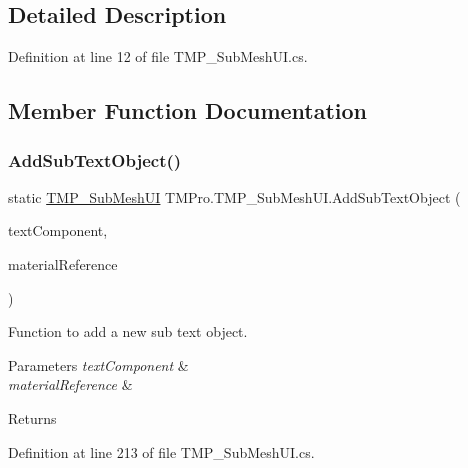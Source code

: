 \subsection{Detailed Description}


Definition at line 12 of file T\+M\+P\+\_\+\+Sub\+Mesh\+U\+I.\+cs.



\subsection{Member Function Documentation}
\mbox{\label{class_t_m_pro_1_1_t_m_p___sub_mesh_u_i_a72235ccd83b46453ebb152ff645602be}} 
\subsubsection{\texorpdfstring{AddSubTextObject()}{AddSubTextObject()}}
{\footnotesize\ttfamily static \mbox{\hyperlink{class_t_m_pro_1_1_t_m_p___sub_mesh_u_i}{T\+M\+P\+\_\+\+Sub\+Mesh\+UI}} T\+M\+Pro.\+T\+M\+P\+\_\+\+Sub\+Mesh\+U\+I.\+Add\+Sub\+Text\+Object (\begin{DoxyParamCaption}\item[{\mbox{\hyperlink{class_t_m_pro_1_1_text_mesh_pro_u_g_u_i}{Text\+Mesh\+Pro\+U\+G\+UI}}}]{text\+Component,  }\item[{\mbox{\hyperlink{struct_t_m_pro_1_1_material_reference}{Material\+Reference}}}]{material\+Reference }\end{DoxyParamCaption})\hspace{0.3cm}{\ttfamily [static]}}



Function to add a new sub text object. 


\begin{DoxyParams}{Parameters}
{\em text\+Component} & \\
\hline
{\em material\+Reference} & \\
\hline
\end{DoxyParams}
\begin{DoxyReturn}{Returns}

\end{DoxyReturn}


Definition at line 213 of file T\+M\+P\+\_\+\+Sub\+Mesh\+U\+I.\+cs.

